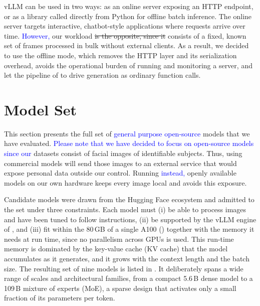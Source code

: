 vLLM can be used in two ways: as an online server exposing an HTTP endpoint, or as a library called directly from Python for offline batch inference. The online server targets interactive, chatbot-style applications where requests arrive over time. \textcolor{blue}{However,} our workload \sout{is the opposite, since it} consists of a fixed, known set of frames processed in bulk without external clients. As a result, we decided to use the offline mode, which removes the HTTP layer and its serialization overhead, avoids the operational burden of running and monitoring a server, and let the pipeline of  to drive generation as ordinary function calls.

\section{Model Set}
\label{sec:models}

This section presents the full set of \textcolor{blue}{general purpose open-source} models that we have evaluated. 
\textcolor{blue}{Please note that we have decided to focus on open-source models since our} datasets consist of facial images of identifiable subjects. Thus, using commercial models will send those images to an external service that would expose personal data outside our control. Running \textcolor{blue}{instead,} openly available models on our own hardware keeps every image local and avoids this exposure.

Candidate models were drawn from the Hugging Face ecosystem and admitted to the set under three constraints. Each model must (i) be able to process images and have been tuned to follow instructions, (ii) be supported by the vLLM engine of , and (iii) fit within the \num{80}\,GB of a single A100 () together with the memory it needs at run time, since no parallelism across GPUs is used. This run-time memory is dominated by the key-value cache (KV cache) that the model accumulates as it generates, and it grows with the context length and the batch size. The resulting set of nine models is listed in . It deliberately spans a wide range of scales and architectural families, from a compact \num{5.6}\,B dense model to a \num{109}\,B mixture of experts (MoE), a sparse design that activates only a small fraction of its parameters per token.

